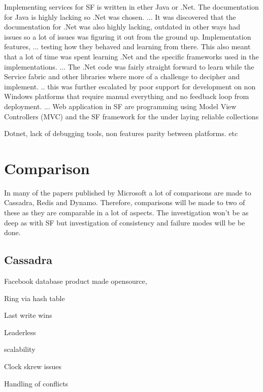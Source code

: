 \documentclass[a4paper,10pt,titlepage]{report}
\begin{document}
    Implementing services for SF is written in ether Java or .Net. The documentation for Java is highly lacking so .Net was chosen. 
        ...
    It was discovered that the documentation for .Net was also highly lacking, outdated in other ways had issues so a lot of issues was figuring it out from the ground up. Implementation features, 
    ...
    testing how they behaved and learning from there. This also meant that a lot of time was spent learning .Net and the specific frameworks used in the implementations.
    ...
    The .Net code was fairly straight forward to learn while the Service fabric and other libraries where more of a challenge to decipher and implement. 
    ..
    this was further escalated by poor support for development on non Windows platforms that require manual everything and no feedback loop from deployment. 
    ...
    Web application in SF are programming using Model View Controllers (MVC) and the SF framework for the under laying reliable collections 
    
    
    
    Dotnet, lack of debugging tools, non features parity between platforms. etc



    \section{Comparison}
    In many of the papers published by Microsoft a lot of comparisons are made to Cassadra, Redis and Dynamo. Therefore, comparisons will be made to two of these as they are comparable in a lot of aspects. The investigation won't be as deep as with SF but investigation of consistency and failure modes will be be done.
    
    
    
    \subsection{Cassadra}
    
    Facebook database product made opensource,
    
    Ring via hash table
    
    Last write wins
    
    Leaderless
    
    scalability
    
    Clock skrew issues
    
    Handling of conflicts
    
\end{document}
